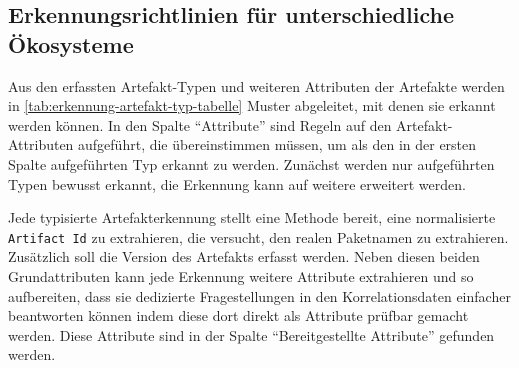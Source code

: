 \subsection{Erkennungsrichtlinien für unterschiedliche Ökosysteme}\label{subsec:erkennung-typspezifische-artefakte}

Aus den erfassten Artefakt-Typen und weiteren Attributen der Artefakte werden in \autoref{tab:erkennung-artefakt-typ-tabelle} Muster abgeleitet, mit denen sie erkannt werden können.
In den Spalte \enquote{Attribute} sind Regeln auf den Artefakt-Attributen aufgeführt, die übereinstimmen müssen, um als den in der ersten Spalte aufgeführten Typ erkannt zu werden.
Zunächst werden nur aufgeführten Typen bewusst erkannt, die Erkennung kann auf weitere erweitert werden.

Jede typisierte Artefakterkennung stellt eine Methode bereit, eine normalisierte \texttt{Artifact Id} zu extrahieren, die versucht, den realen Paketnamen zu extrahieren.
Zusätzlich soll die Version des Artefakts erfasst werden.
Neben diesen beiden Grundattributen kann jede Erkennung weitere Attribute extrahieren und so aufbereiten, dass sie dedizierte Fragestellungen in den Korrelationsdaten einfacher beantworten können indem diese dort direkt als Attribute prüfbar gemacht werden.
Diese Attribute sind in der Spalte \enquote{Bereitgestellte Attribute} gefunden werden.

